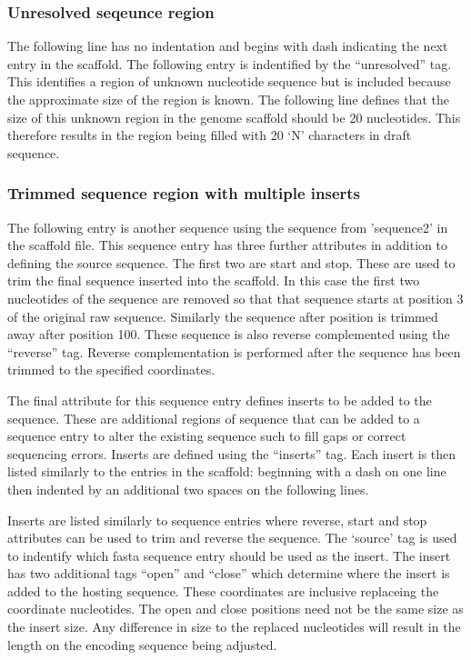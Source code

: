 \documentclass[10pt]{bmc_article}
\newenvironment{bmcformat}{\begin{raggedright}\baselineskip20pt\sloppy\setboolean{publ}{false}}{\end{raggedright}\baselineskip20pt\sloppy}
\begin{document}
\begin{bmcformat}
\subsubsection*{Unresolved seqeunce region} %

The following line has no indentation and begins with dash indicating the next
entry in the scaffold. The following entry is indentified by the ``unresolved''
tag. This identifies a region of unknown nucleotide sequence but is included
because the approximate size of the region is known. The following line defines
that the size of this unknown region in the genome scaffold should be 20
nucleotides. This therefore results in the region being filled with 20 `N'
characters in draft sequence. \pb

\subsubsection*{Trimmed sequence region with multiple inserts} %

The following entry is another sequence using the sequence from 'sequence2' in
the scaffold file. This sequence entry has three further attributes in addition
to defining the source sequence. The first two are start and stop. These are
used to trim the final sequence inserted into the scaffold. In this case the
first two nucleotides of the sequence are removed so that that sequence starts
at position 3 of the original raw sequence. Similarly the sequence after
position is trimmed away after position 100. These sequence is also reverse
complemented using the ``reverse'' tag. Reverse complementation is performed
after the sequence has been trimmed to the specified coordinates. \pb

The final attribute for this sequence entry defines inserts to be added to the
sequence. These are additional regions of sequence that can be added to
a sequence entry to alter the existing sequence such to fill gaps or correct
sequencing errors. Inserts are defined using the ``inserts'' tag. Each insert
is then listed similarly to the entries in the scaffold: beginning with a dash
on one line then indented by an additional two spaces on the following lines.
\pb

Inserts are listed similarly to sequence entries where reverse, start and stop
attributes can be used to trim and reverse the sequence. The `source' tag is
used to indentify which fasta sequence entry should be used as the insert.  The
insert has two additional tags ``open'' and ``close'' which determine where the
insert is added to the hosting sequence. These coordinates are inclusive
replaceing the coordinate nucleotides. The open and close positions need not be
the same size as the insert size. Any difference in size to the replaced
nucleotides will result in the length on the encoding sequence being adjusted.
\pb


\end{bmcformat}
\end{document}
